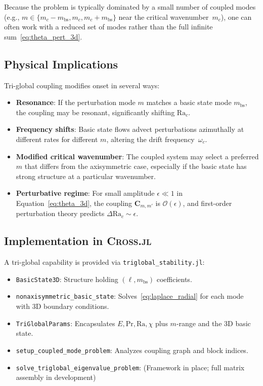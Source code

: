 \documentclass[11pt]{article}
\numberwithin{equation}{section}
\begin{document}
Because the problem is typically dominated by a small number of coupled modes (e.g., $m\in\{m_c-m_{\text{bs}},m_c,m_c+m_{\text{bs}}\}$ near the critical wavenumber~$m_c$), one can often work with a reduced set of modes rather than the full infinite sum~\eqref{eq:theta_pert_3d}.

\subsection{Physical Implications}

Tri-global coupling modifies onset in several ways:
\begin{itemize}
  \item \textbf{Resonance}: If the perturbation mode $m$ matches a basic state mode $m_{\text{bs}}$, the coupling may be resonant, significantly shifting $\mathrm{Ra}_c$.

  \item \textbf{Frequency shifts}: Basic state flows advect perturbations azimuthally at different rates for different $m$, altering the drift frequency~$\omega_c$.

  \item \textbf{Modified critical wavenumber}: The coupled system may select a preferred $m$ that differs from the axisymmetric case, especially if the basic state has strong structure at a particular wavenumber.

  \item \textbf{Perturbative regime}: For small amplitude $\epsilon \ll 1$ in Equation~\eqref{eq:theta_3d}, the coupling $\bm{C}_{m,m'}$ is $\mathcal{O}(\epsilon)$, and first-order perturbation theory predicts $\Delta\mathrm{Ra}_c \sim \epsilon$.
\end{itemize}

\subsection{Implementation in \textsc{Cross.jl}}

A tri-global capability is provided via \texttt{triglobal\_stability.jl}:
\begin{itemize}
  \item \texttt{BasicState3D}: Structure holding $(\ell,m_{\text{bs}})$ coefficients.
  \item \texttt{nonaxisymmetric\_basic\_state}: Solves~\eqref{eq:laplace_radial} for each mode with 3D boundary conditions.
  \item \texttt{TriGlobalParams}: Encapsulates $E,\mathrm{Pr},\mathrm{Ra},\chi$ plus $m$-range and the 3D basic state.
  \item \texttt{setup\_coupled\_mode\_problem}: Analyzes coupling graph and block indices.
  \item \texttt{solve\_triglobal\_eigenvalue\_problem}: (Framework in place; full matrix assembly in development)
\end{itemize}
\end{document}

